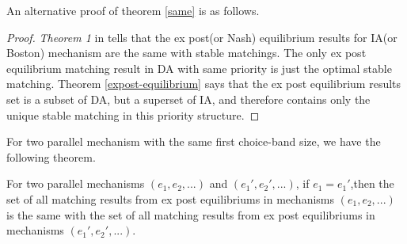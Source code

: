 An alternative proof of theorem \ref{same} is as follows.
\begin{proof}
  \emph{Theorem 1} in \parencite{Ergin2006} tells that the ex post(or Nash) equilibrium results for IA(or Boston) mechanism are the same with stable matchings. The only ex post equilibrium matching result  in DA with same priority is just the optimal stable matching. Theorem \ref{expost-equilibrium} says that the ex post equilibrium results set is a subset of DA, but a superset of IA, and therefore contains only the unique stable matching in this priority structure.
\end{proof}  




For two parallel mechanism with the same first choice-band size, we have the following theorem.

\begin{thm}
  \label{first-equal}  
 For two parallel mechanisms $(e_1,e_2,...)$ and $(e_1',e_2',...)$, if $e_1 = e_1'$,then the set of all matching results from  ex post equilibriums  in mechanisms $(e_1,e_2,...)$ is the same with the set of all matching results from  ex post equilibriums in mechanisms $(e_1',e_2',...)$.
\end{thm}

